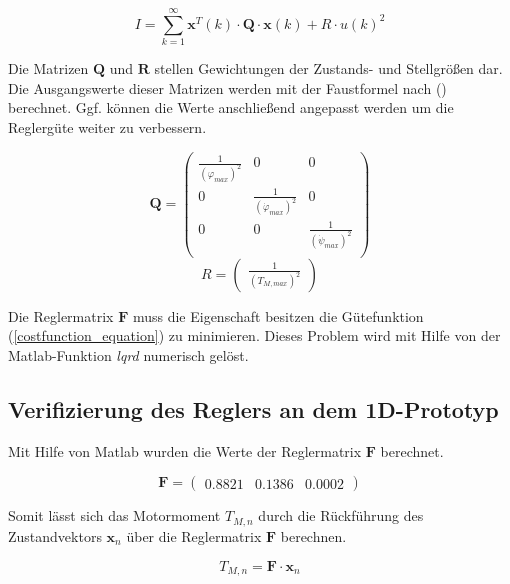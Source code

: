 \begin{equation}
\label{costfunction_equation}
I = \sum_{k=1}^\infty \textbf{x}^T(k) \cdot \textbf{Q} \cdot \textbf{x}(k) + R\cdot u(k)^2
\end{equation}

Die Matrizen $\textbf{Q}$ und $\textbf{R}$ stellen Gewichtungen der Zustands- und Stellgrößen dar. Die Ausgangswerte dieser Matrizen werden mit der Faustformel nach (\cite{lqrnotes}) berechnet. Ggf. können die Werte anschließend angepasst werden um die Reglergüte weiter zu verbessern.

\begin{equation}
\textbf{Q} = \begin{pmatrix}
\frac{1}{(\varphi_{max})^2} & 0 & 0 \\
0 & \frac{1}{(\dot{\varphi}_{max})^2} & 0 \\
0 & 0 & \frac{1}{(\dot{\psi}_{max})^2} \\
\end{pmatrix}
\end{equation}
\begin{equation}
R = \begin{pmatrix}
\frac{1}{(T_{M,max})^2}
\end{pmatrix}
\end{equation}

Die Reglermatrix $\textbf{F}$ muss die Eigenschaft besitzen die Gütefunktion (\ref{costfunction_equation}) zu minimieren. Dieses Problem wird mit Hilfe von der Matlab-Funktion \textit{lqrd} numerisch gelöst.

\subsection{Verifizierung des Reglers an dem 1D-Prototyp}
Mit Hilfe von Matlab wurden die Werte der Reglermatrix $\boldsymbol{F}$ berechnet.

\begin{equation}
\boldsymbol{F} = \begin{pmatrix}
0.8821 & 0.1386 & 0.0002
\end{pmatrix}
\end{equation}

Somit lässt sich das Motormoment $T_{M,n}$ durch die Rückführung des Zustandvektors $\boldsymbol{x}_n$ über die Reglermatrix $\boldsymbol{F}$ berechnen.

\begin{equation}
T_{M,n} = \boldsymbol{F} \cdot \boldsymbol{x}_n
\end{equation}

